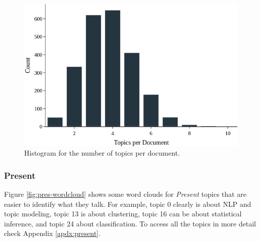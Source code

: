 \begin{figure}[h!]
	\centering
	\includegraphics[width=0.6\linewidth]{01.Chapters/05.Results/past-topic-per-doc}
	\caption{Histogram for the number of topics per document.}
	\label{fig:past-topic-per-doc}
\end{figure}


\subsubsection{Present}

Figure \ref{fig:pres-wordcloud} shows some word clouds for \textit{Present} topics that are easier to identify what they talk. For example, topic 0 clearly is about NLP and topic modeling, topic 13 is about clustering, topic 16 can be about statistical inference, and topic 24 about classification. To access all the topics in more detail check Appendix \ref{apdx:present}.

